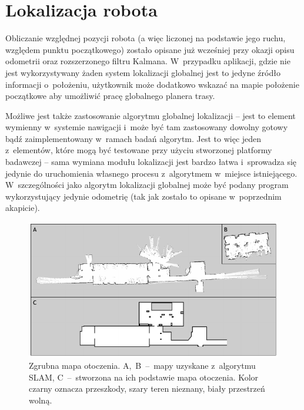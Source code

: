 \section{Lokalizacja robota}

Obliczanie względnej pozycji robota (a więc liczonej na podstawie jego ruchu, względem
punktu początkowego) zostało opisane już wcześniej przy okazji opisu odometrii
oraz rozszerzonego filtru Kalmana. W~przypadku aplikacji, gdzie nie jest wykorzystywany
żaden system lokalizacji globalnej jest to jedyne źródło informacji o~położeniu,
użytkownik może dodatkowo wskazać na mapie położenie początkowe aby umożliwić pracę
globalnego planera trasy.

Możliwe jest także zastosowanie algorytmu globalnej lokalizacji -- jest to element
wymienny w~systemie nawigacji i~może być tam zastosowany dowolny gotowy bądź zaimplementowany
w~ramach badań algorytm. Jest to więc jeden z~elementów, które mogą być testowane
przy użyciu stworzonej platformy badawczej -- sama wymiana modułu lokalizacji jest
bardzo łatwa i~sprowadza się jedynie do uruchomienia własnego procesu z~algorytmem
w~miejsce istniejącego. W~szczególności jako algorytm lokalizacji globalnej może być
podany program wykorzystujący jedynie odometrię (tak jak zostało to opisane w~poprzednim
akapicie).

\begin{figure}[htb!]
\centering
\includegraphics[width=15cm]{../../Common/img/maps}
\caption[Mapa otoczenia]{Zgrubna mapa otoczenia. A,~B~--~mapy uzyskane z~algorytmu SLAM,
C~--~stworzona na ich podstawie mapa otoczenia. Kolor czarny oznacza przeszkody, szary teren
nieznany, biały przestrzeń wolną.}
\label{fig:maps}
\end{figure}

